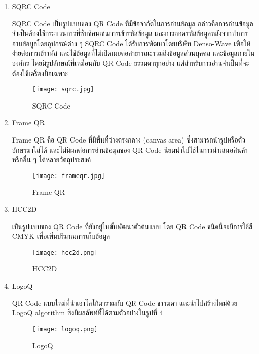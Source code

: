 \begin{enumerate}[listparindent=1.25em]
    \item SQRC Code

    SQRC Code เป็นรูปแบบของ QR Code ที่มีข้อจำกัดในการอ่านข้อมูล กล่าวคือการอ่านข้อมูลจำเป็นต้องใช้กระบวนการที่ซับซ้อนเช่นการเข้ารหัสข้อมูล และการถอดรหัสข้อมูลหลังจากทำการอ่านข้อมูลโดยอุปกรณ์ต่าง ๆ SQRC Code ได้รับการพัฒนาโดยบริษัท Denso-Wave เพื่อให้ง่ายต่อการเข้ารหัส และใช้ข้อมูลที่ไม่เปิดเผยต่อสาธารณะรวมถึงข้อมูลส่วนบุคคล และข้อมูลภายในองค์กร โดยมีรูปลักษณ์ที่เหมือนกับ QR Code ธรรมดาทุกอย่าง แต่สำหรับการอ่านจำเป็นที่จะต้องใช้เครื่องมือเฉพาะ \cite{SQRC}
    \begin{figure}[ht]
        \centering
        \texttt{[image: sqrc.jpg]}
        \caption{SQRC Code}
        \label{fig:sqrc}
    \end{figure}

    \pagebreak
    \item Frame QR
    
    Frame QR คือ QR Code ที่มีพื้นที่ว่างตรงกลาง (canvas area) ซึ่งสามารถนำรูปหรือตัวอักษรมาใส่ได้ และไม่มีผลต่อการอ่านข้อมูลของ QR Code นิยมนำไปใช้ในการนำเสนอสินค้าหรืออื่น ๆ ได้หลายวัตถุประสงค์
    \begin{figure}[ht]
        \centering
        \texttt{[image: frameqr.jpg]}
        \caption{Frame QR}
        \label{fig:frameqr}
    \end{figure}

    \item HCC2D
    
    เป็นรูปแบบของ QR Code ที่ยังอยู่ในขั้นพัฒนาตัวต้นแบบ โดย QR Code ชนิดนี้จะมีการใช้สี CMYK เพื่อเพิ่มปริมาณการเก็บข้อมูล
    \begin{figure}[ht]
        \centering
        \texttt{[image: hcc2d.png]}
        \caption{HCC2D}
        \label{fig:hcc2d}
    \end{figure}

    \item LogoQ
    
    QR Code แบบใหม่ที่นำเอาโลโก้มารวมกับ QR Code ธรรมดา และนำไปสร้างใหม่ด้วย LogoQ algorithm ซึ่งมีผลลัพท์ที่ได้ตามตัวอย่างในรูปที่ \ref{fig:logoq}
    \begin{figure}[ht]
        \centering
        \texttt{[image: logoq.png]}
        \caption{LogoQ}
        \label{fig:logoq}
    \end{figure}

\end{enumerate}

